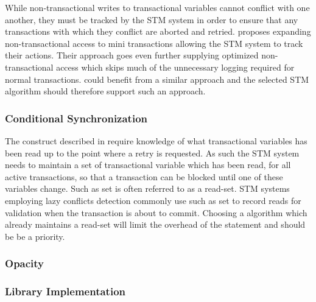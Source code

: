 While non-transactional writes to transactional variables cannot conflict with one another, they must be tracked by the \ac{STM} system in order to ensure that any transactions with which they conflict are aborted and retried. \cite{hindman2006atomicity} proposes expanding non-transactional access to mini transactions allowing the \ac{STM} system to track their actions. Their approach goes even further supplying optimized non-transactional access which skips much of the unnecessary logging required for normal transactions. \stmnamesp could benefit from a similar approach and the selected \ac{STM} algorithm should therefore support such an approach.
 
\subsubsection{Conditional Synchronization}
The  construct described in  require knowledge of what transactional variables has been read up to the point where a retry is requested\cite{harris2005composable}. As such the \ac{STM} system needs to maintain a set of transactional variable which has been read, for all active transactions, so that a transaction can be blocked until one of these variables change. Such as set is often referred to as a read-set\cite{dice2006transactional}\cite{harris2010transactional}\cite{herlihy2012art}. \ac{STM} systems employing lazy conflicts detection commonly use such as set to record reads for validation when the transaction is about to commit\cite{dice2006transactional}\cite{mohamedin2013bytestm}. Choosing a algorithm which already maintains a read-set will limit the overhead of the  statement and should be be a priority.

\subsubsection{Opacity}
\subsubsection{Library Implementation}

